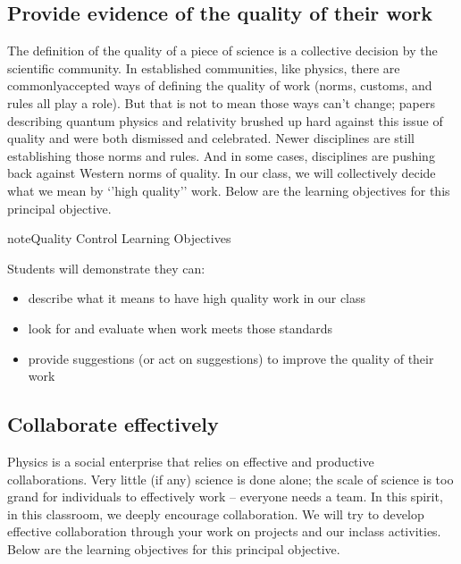 \documentclass[letterpaper,10pt,english]{jupyterBook}
\begin{document}
\subsection{Provide evidence of the quality of their work}
\label{\detokenize{content/0_course/goals:provide-evidence-of-the-quality-of-their-work}}
\sphinxAtStartPar
The definition of the quality of a piece of science is a collective decision by the scientific community. In established communities, like physics, there are commonly\sphinxhyphen{}accepted ways of defining the quality of work (norms, customs, and rules all play a role). But that is not to mean those ways can’t change; papers describing quantum physics and relativity brushed up hard against this issue of quality and were both dismissed and celebrated. Newer disciplines are still establishing those norms and rules. And in some cases, disciplines are pushing back against Western norms of quality. In our class, we will collectively decide what we mean by ‘’high quality’’ work. Below are the learning objectives for this principal objective.

\begin{sphinxadmonition}{note}{Quality Control Learning Objectives}

\sphinxAtStartPar
Students will demonstrate they can:
\begin{itemize}
\item {} 
\sphinxAtStartPar
describe what it means to have high quality work in our class

\item {} 
\sphinxAtStartPar
look for and evaluate when work meets those standards

\item {} 
\sphinxAtStartPar
provide suggestions (or act on suggestions) to improve the quality of their work

\end{itemize}
\end{sphinxadmonition}


\subsection{Collaborate effectively}
\label{\detokenize{content/0_course/goals:collaborate-effectively}}
\sphinxAtStartPar
Physics is a social enterprise that relies on effective and productive collaborations. Very little (if any) science is done alone; the scale of science is too grand for individuals to effectively work – everyone needs a team. In this spirit, in this classroom, we deeply encourage collaboration. We will try to develop effective collaboration through your work on projects and our in\sphinxhyphen{}class activities. Below are the learning objectives for this principal objective.
\end{document}
